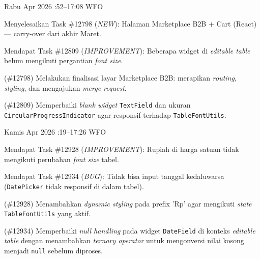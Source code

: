 \renewcommand{\reportmonth}{April}
\renewcommand{\signaturedate}{1 Mei 2026}


\begin{logtable}


    {
        Rabu  Apr 2026 :52--17:08 \linebreak %
        WFO
    }{
        \begin{loglist}
            \item Menyelesaikan Task \#12798 (\textit{NEW}): Halaman Marketplace B2B + Cart
            (React) --- carry-over dari akhir Maret.
            \item Mendapat Task \#12809 (\textit{IMPROVEMENT}): Beberapa widget di
            \textit{editable table} belum mengikuti pergantian \textit{font size}.
        \end{loglist}
    }{
        \begin{logwork}
            \item (\#12798) Melakukan finalisasi layar Marketplace B2B: merapikan \textit{routing}, \textit{styling}, dan mengajukan \textit{merge request}.
            \item (\#12809) Memperbaiki \textit{blank widget} \texttt{TextField} dan ukuran \texttt{CircularProgressIndicator} agar responsif terhadap \texttt{TableFontUtils}.
        \end{logwork}
    }

    {
        Kamis  Apr 2026 :19--17:26 \linebreak %
        WFO
    }{
        \begin{loglist}
            \item Mendapat Task \#12928 (\textit{IMPROVEMENT}): Rupiah di harga satuan tidak
            mengikuti perubahan \textit{font size} tabel.
            \item Mendapat Task \#12934 (\textit{BUG}): Tidak bisa input tanggal kedaluwarsa
            (\texttt{DatePicker} tidak responsif di dalam tabel).
        \end{loglist}
    }{
        \begin{logwork}
            \item (\#12928) Menambahkan \textit{dynamic styling} pada prefix 'Rp' agar mengikuti \textit{state} \texttt{TableFontUtils} yang aktif.
            \item (\#12934) Memperbaiki \textit{null handling} pada widget \texttt{DateField} di konteks \textit{editable table} dengan menambahkan \textit{ternary operator} untuk mengonversi nilai kosong menjadi \texttt{null} sebelum diproses.
        \end{logwork}
    }


\end{logtable}
